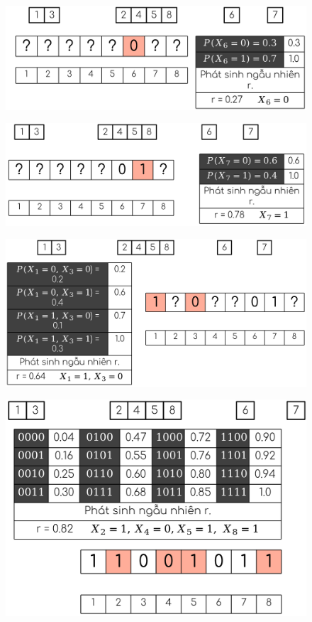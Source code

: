 \documentclass{book}
\begin{document}
            \begin{figure}[H]
                \centering
                \includegraphics[width=0.7\linewidth]{images/ecga5.png}
                \label{fig:ecga5}
            \end{figure}
            \begin{figure}[H]
                \centering
                \includegraphics[width=0.7\linewidth]{images/ecga6.png}
                \label{fig:ecga6}
            \end{figure}
            \begin{figure}[H]
                \centering
                \includegraphics[width=0.7\linewidth]{images/ecga7.png}
                \label{fig:ecga7}
            \end{figure}
            \begin{figure}[H]
                \centering
                \includegraphics[width=0.7\linewidth]{images/ecga8.png}
                \label{fig:ecga8}
            \end{figure}
\end{document}
